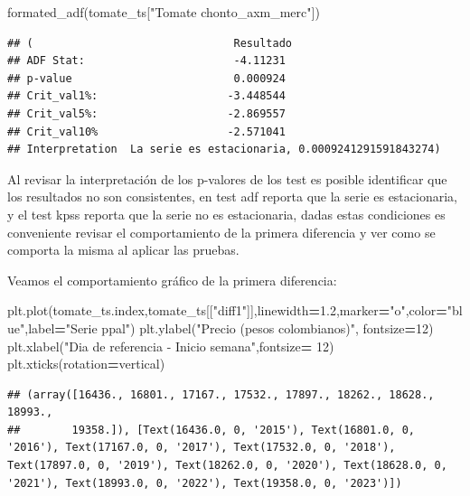 \documentclass[
]{book}
\newenvironment{Shaded}{\begin{snugshade}}{\end{snugshade}}
\newcommand{\DecValTok}[1]{\textcolor[rgb]{0.00,0.00,0.81}{#1}}
\newcommand{\FloatTok}[1]{\textcolor[rgb]{0.00,0.00,0.81}{#1}}
\newcommand{\NormalTok}[1]{#1}
\newcommand{\OperatorTok}[1]{\textcolor[rgb]{0.81,0.36,0.00}{\textbf{#1}}}
\newcommand{\StringTok}[1]{\textcolor[rgb]{0.31,0.60,0.02}{#1}}
\begin{document}
\begin{Shaded}
\begin{Highlighting}[]
\NormalTok{formated\_adf(tomate\_ts[}\StringTok{"Tomate chonto\_axm\_merc"}\NormalTok{])}
\end{Highlighting}
\end{Shaded}

\begin{verbatim}
## (                               Resultado
## ADF Stat:                       -4.11231
## p-value                         0.000924
## Crit_val1%:                    -3.448544
## Crit_val5%:                    -2.869557
## Crit_val10%                    -2.571041
## Interpretation  La serie es estacionaria, 0.0009241291591843274)
\end{verbatim}

Al revisar la interpretación de los p-valores de los test es posible identificar que los resultados no son consistentes, en test adf reporta que la serie es estacionaria, y el test kpss reporta que la serie no es estacionaria, dadas estas condiciones es conveniente revisar el comportamiento de la primera diferencia y ver como se comporta la misma al aplicar las pruebas.

Veamos el comportamiento gráfico de la primera diferencia:

\begin{Shaded}
\begin{Highlighting}[]


\NormalTok{plt.plot(tomate\_ts.index,tomate\_ts[[}\StringTok{"diff1"}\NormalTok{]],linewidth}\OperatorTok{=}\FloatTok{1.2}\NormalTok{,marker}\OperatorTok{=}\StringTok{"o"}\NormalTok{,color}\OperatorTok{=}\StringTok{"blue"}\NormalTok{,label}\OperatorTok{=}\StringTok{"Serie ppal"}\NormalTok{)}
\NormalTok{plt.ylabel(}\StringTok{"Precio (pesos colombianos)"}\NormalTok{, fontsize}\OperatorTok{=}\DecValTok{12}\NormalTok{)}
\NormalTok{plt.xlabel(}\StringTok{"Dia de referencia {-} Inicio semana"}\NormalTok{,fontsize}\OperatorTok{=} \DecValTok{12}\NormalTok{)}
\NormalTok{plt.xticks(rotation}\OperatorTok{=}\StringTok{\textquotesingle{}vertical\textquotesingle{}}\NormalTok{)}
\end{Highlighting}
\end{Shaded}

\begin{verbatim}
## (array([16436., 16801., 17167., 17532., 17897., 18262., 18628., 18993.,
##        19358.]), [Text(16436.0, 0, '2015'), Text(16801.0, 0, '2016'), Text(17167.0, 0, '2017'), Text(17532.0, 0, '2018'), Text(17897.0, 0, '2019'), Text(18262.0, 0, '2020'), Text(18628.0, 0, '2021'), Text(18993.0, 0, '2022'), Text(19358.0, 0, '2023')])
\end{verbatim}
\end{document}
